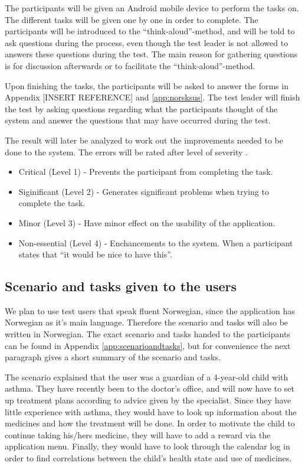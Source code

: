 The participants will be given an Android mobile device to perform the tasks on. The different tasks will be given one by one in order to complete. The participants will be introduced to the ``think-aloud''-method, and will be told to ask questions during the process, even though the test leader is not allowed to answers these questions during the test. The main reason for gathering questions is for discussion afterwards or to facilitate the ``think-aloud''-method. 

Upon finishing the tasks, the participants will be asked to answer the forms in Appendix [INSERT REFERENCE] and \ref{app:norsksus}. The test leader will finish the test by asking questions regarding what the participants thought of the system and answer the questions that may have occurred during the test. 

The result will later be analyzed to work out the improvements needed to be done to the system. The errors will be rated after level of severity \cite{dumas1995practical}. 

\begin{itemize}
\item{Critical (Level 1) - Prevents the participant from completing the task.}
\item{Siginificant (Level 2) - Generates significant problems when trying to complete the task.}
\item{Minor (Level 3) - Have minor effect on the usability of the application.}
\item{Non-essential (Level 4) - Enchancements to the system. When a participant states that ``it would be nice to have this''.}
\end{itemize}



\subsection{Scenario and tasks given to the users}
We plan to use test users that speak fluent Norwegian, since the application has Norwegian as it's main language. Therefore the scenario and tasks will also be written in Norwegian. The exact scenario and tasks handed to the participants can be found in Appendix \ref{app:scenarioandtasks}, but for convenience the next paragraph gives a short summary of the scenario and tasks.

The scenario explained that the user was a guardian of a 4-year-old child with asthma. They have recently been to the doctor's office, and will now have to set up treatment plans according to advice given by the specialist. Since they have little experience with asthma, they would have to look up information about the medicines and how the treatment will be done. In order to motivate the child to continue taking his/hers medicine, they will have to add a reward via the application menu. Finally, they would have to look through the calendar log in order to find correlations between the child's health state and use of medicines. 